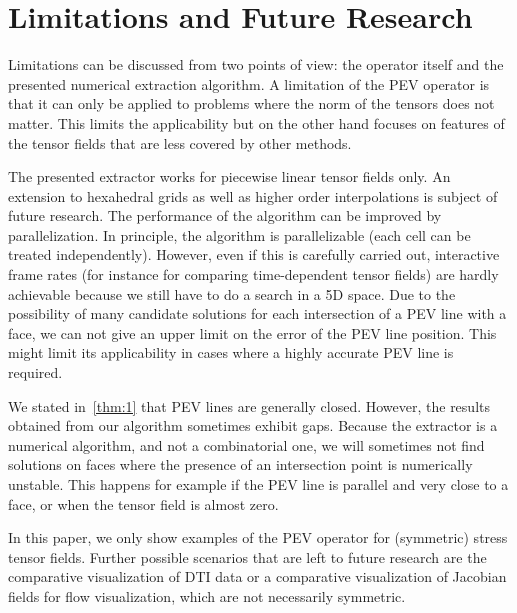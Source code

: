 
%
\section{Limitations and Future Research} %
\label{sec:pev_limitations}
% 
Limitations can be discussed from two points of view:
%
the operator itself and the presented numerical extraction algorithm.
%
A limitation of the \ac{PEV} operator is that it can only be applied to problems
where the norm of the tensors does not matter.
%
This limits the applicability but on the other hand focuses on features of the
tensor fields that are less covered by other methods.
%

%
The presented extractor works for piecewise linear tensor fields only.
%
An extension to hexahedral grids as well as higher order interpolations is
subject of future research.
%
The performance of the algorithm can be improved by parallelization.
%
In principle, the algorithm is parallelizable (each cell can be treated
independently).
%
However, even if this is carefully carried out, interactive frame rates (for
instance for comparing time-dependent tensor fields) are hardly achievable
because we still have to do a search in a \ac{5D} space.
%
Due to the possibility of many candidate solutions for each intersection of a
\ac{PEV} line with a face, we can not give an upper limit on the error of the
\ac{PEV} line position.
%
This might limit its applicability in cases where a highly accurate \ac{PEV} line is
required.
%

%
%
We stated in~\autoref{thm:1} that \ac{PEV} lines are generally closed.
%
However, the results obtained from our algorithm sometimes exhibit gaps.
%
Because the extractor is a numerical algorithm, and not a combinatorial one, we
will sometimes not find solutions on faces where the presence of an intersection
point is numerically unstable.
%
This happens for example if the \ac{PEV} line is parallel and very close to a face,
or when the tensor field is almost zero.
%
%

%
In this paper, we only show examples of the \ac{PEV} operator for (symmetric) stress
tensor fields.
%
Further possible scenarios that are left to future research are the comparative
visualization of \ac{DTI} data or a comparative visualization of Jacobian fields
for flow visualization, which are not necessarily symmetric.
%